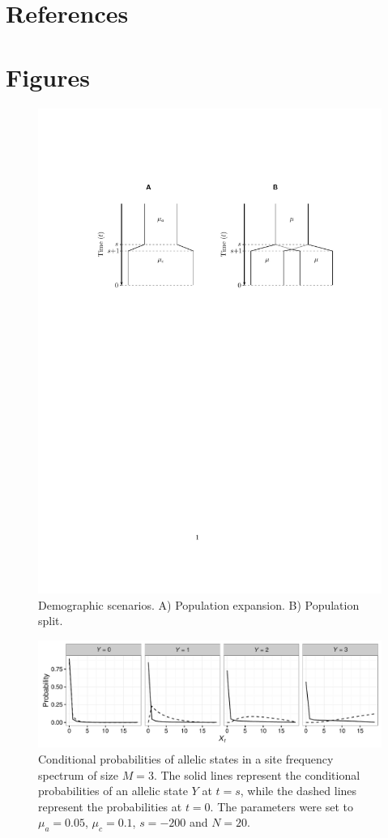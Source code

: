 \documentclass[preprint]{elsarticle}
\newcommand\y{\ensuremath{Y}}
\begin{document}
\section*{References}



\newpage

\section*{Figures}

\begin{figure}[ht]
\includegraphics[width = 12cm]{diags.pdf}
\caption{Demographic scenarios. A) Population expansion. B) Population split.}\label{diag}
\end{figure}

\begin{figure}[ht]
\includegraphics[width = 12cm]{cProb.pdf}
\caption{Conditional probabilities of allelic states in a site frequency spectrum of size $M=3$. The solid lines represent the conditional probabilities of an allelic state $\y$ at $t=s$, while the dashed lines represent the probabilities at $t=0$. The parameters were set to $\mu_a=0.05$, $\mu_c=0.1$, $s=-200$ and $N=20$.}\label{cProb}
\end{figure}
\end{document}
